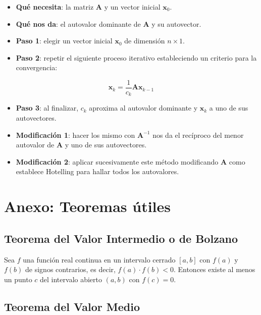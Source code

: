 \documentclass[openany]{book}
\providecommand{\tightlist}{%
  \setlength{\itemsep}{0pt}\setlength{\parskip}{0pt}}
\begin{document}
\begin{itemize}
\tightlist
\item
  \textbf{Qué necesita}: la matriz \(\mathbf{A}\) y un vector inicial \(\mathbf{x}_0\).
\item
  \textbf{Qué nos da}: el autovalor dominante de \(\mathbf{A}\) y su autovector.
\item
  \textbf{Paso 1}: elegir un vector inicial \(\mathbf{x}_0\) de dimensión \(n \times 1\).
\item
  \textbf{Paso 2}: repetir el siguiente proceso iterativo estableciendo un criterio para la convergencia:
\end{itemize}

\[
\textbf{x}_k = \frac{1}{c_k} \textbf{Ax}_{k-1}
\]

\begin{itemize}
\item
  \textbf{Paso 3}: al finalizar, \(c_k\) aproxima al autovalor dominante y \(\mathbf{x}_k\) a uno de sus autovectores.
\item
  \textbf{Modificación 1}: hacer los mismo con \(\mathbf{A}^{-1}\) nos da el recíproco del menor autovalor de \(\mathbf{A}\) y uno de sus autovectores.
\item
  \textbf{Modificación 2}: aplicar sucesivamente este método modificando \(\mathbf{A}\) como establece Hotelling para hallar todos los autovalores.
\end{itemize}

\hypertarget{anexo-teoremas-uxfatiles}{%
\chapter*{Anexo: Teoremas útiles}\label{anexo-teoremas-uxfatiles}}

\hypertarget{teorema-del-valor-intermedio-o-de-bolzano}{%
\section*{Teorema del Valor Intermedio o de Bolzano}\label{teorema-del-valor-intermedio-o-de-bolzano}}

Sea \(f\) una función real continua en un intervalo cerrado \([a,b]\) con \(f(a)\) y \(f(b)\) de signos contrarios, es decir, \(f(a)\cdot f(b) < 0\). Entonces existe al menos un punto \(c\) del intervalo abierto \((a, b)\) con \(f(c) = 0\).

\hypertarget{teorema-del-valor-medio}{%
\section*{Teorema del Valor Medio}\label{teorema-del-valor-medio}}
\end{document}
